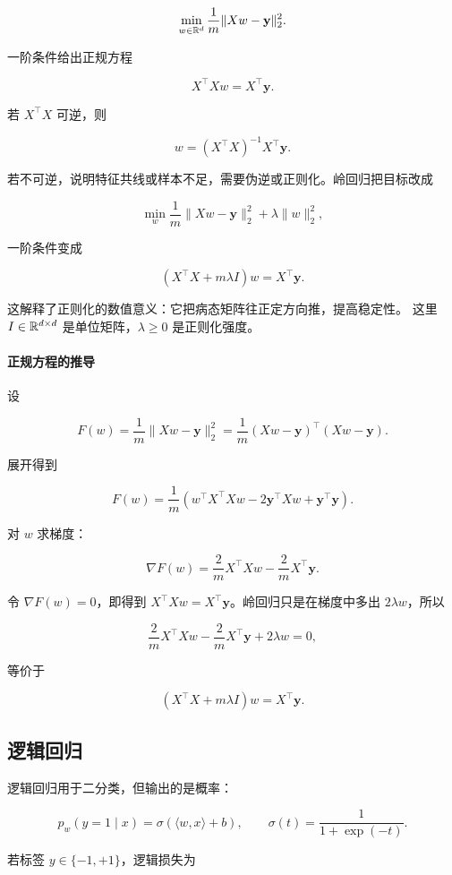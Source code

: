 \documentclass[11pt]{ctexart}
\begin{document}
\[
  \min_{w\in\mathbb{R}^d}
  \frac1m\|Xw-\mathbf{y}\|_2^2.
\]

一阶条件给出正规方程

\[
  X^\top Xw=X^\top \mathbf{y}.
\]

若 \(X^\top X\) 可逆，则

\[
  w=(X^\top X)^{-1}X^\top \mathbf{y}.
\]

若不可逆，说明特征共线或样本不足，需要伪逆或正则化。岭回归把目标改成

\[
  \min_w
  \frac1m\|Xw-\mathbf{y}\|_2^2+\lambda\|w\|_2^2,
\]

一阶条件变成

\[
  (X^\top X+m\lambda I)w=X^\top \mathbf{y}.
\]

这解释了正则化的数值意义：它把病态矩阵往正定方向推，提高稳定性。
这里 \(I\in\mathbb{R}^{d\times d}\) 是单位矩阵，\(\lambda\ge0\) 是正则化强度。

\paragraph{正规方程的推导}

设

\[
  F(w)=\frac1m\|Xw-\mathbf{y}\|_2^2
  =
  \frac1m(Xw-\mathbf{y})^\top(Xw-\mathbf{y}).
\]

展开得到

\[
  F(w)
  =
  \frac1m
  \left(
    w^\top X^\top Xw
    -
    2\mathbf{y}^\top Xw
    +
    \mathbf{y}^\top\mathbf{y}
  \right).
\]

对 \(w\) 求梯度：

\[
  \nabla F(w)
  =
  \frac{2}{m}X^\top Xw
  -
  \frac{2}{m}X^\top\mathbf{y}.
\]

令 \(\nabla F(w)=0\)，即得到 \(X^\top Xw=X^\top\mathbf{y}\)。岭回归只是在梯度中多出 \(2\lambda w\)，所以

\[
  \frac{2}{m}X^\top Xw
  -
  \frac{2}{m}X^\top\mathbf{y}
  +
  2\lambda w
  =
  0,
\]

等价于

\[
  (X^\top X+m\lambda I)w=X^\top\mathbf{y}.
\]

\subsection{逻辑回归}

逻辑回归用于二分类，但输出的是概率：

\[
  p_w(y=1\mid x)=\sigma(\langle w,x\rangle+b),
  \qquad
  \sigma(t)=\frac{1}{1+\exp(-t)}.
\]

若标签 \(y\in\{-1,+1\}\)，逻辑损失为
\end{document}

